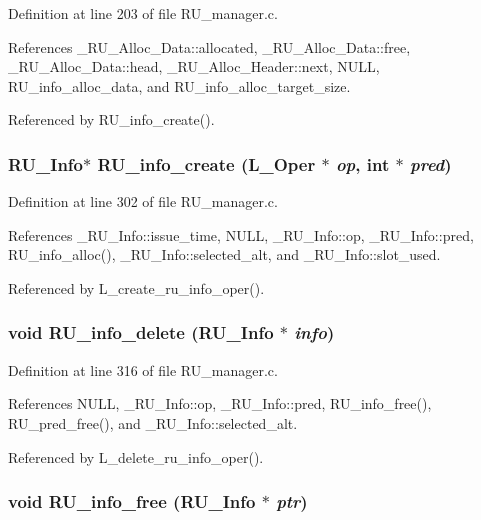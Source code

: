 Definition at line 203 of file RU\_\-manager.c.

References \_\-RU\_\-Alloc\_\-Data::allocated, \_\-RU\_\-Alloc\_\-Data::free, \_\-RU\_\-Alloc\_\-Data::head, \_\-RU\_\-Alloc\_\-Header::next, NULL, RU\_\-info\_\-alloc\_\-data, and RU\_\-info\_\-alloc\_\-target\_\-size.

Referenced by RU\_\-info\_\-create().
\subsubsection{\setlength{\rightskip}{0pt plus 5cm}\bf{RU\_\-Info}$\ast$ RU\_\-info\_\-create (L\_\-Oper $\ast$ {\em op}, int $\ast$ {\em pred})}\label{RU__manager_8c_29762a07dba8b05f2473077e4a60dc59}




Definition at line 302 of file RU\_\-manager.c.

References \_\-RU\_\-Info::issue\_\-time, NULL, \_\-RU\_\-Info::op, \_\-RU\_\-Info::pred, RU\_\-info\_\-alloc(), \_\-RU\_\-Info::selected\_\-alt, and \_\-RU\_\-Info::slot\_\-used.

Referenced by L\_\-create\_\-ru\_\-info\_\-oper().
\subsubsection{\setlength{\rightskip}{0pt plus 5cm}void RU\_\-info\_\-delete (\bf{RU\_\-Info} $\ast$ {\em info})}\label{RU__manager_8c_ae07a2cb1d5ab3c87d9bc65533e6618b}




Definition at line 316 of file RU\_\-manager.c.

References NULL, \_\-RU\_\-Info::op, \_\-RU\_\-Info::pred, RU\_\-info\_\-free(), RU\_\-pred\_\-free(), and \_\-RU\_\-Info::selected\_\-alt.

Referenced by L\_\-delete\_\-ru\_\-info\_\-oper().
\subsubsection{\setlength{\rightskip}{0pt plus 5cm}void RU\_\-info\_\-free (\bf{RU\_\-Info} $\ast$ {\em ptr})}\label{RU__manager_8c_9fde0ac1f37deeb5971b5e79ab69022f}




